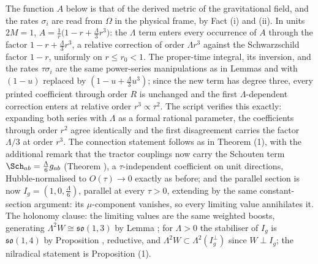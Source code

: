 The function $A$ below is that of the derived metric of the gravitational field, and the rates $\sigma_i$ are read from $\Omega$ in the physical frame, by Fact (i) and (ii). In units $2M = 1$, $A = \tfrac{1}{r}\bigl(1 - r + \tfrac{\Lambda}{3}r^3\bigr)$: the $\Lambda$ term enters every occurrence of $A$ through the factor $1 - r + \tfrac{\Lambda}{3}r^3$, a relative correction of order $\Lambda r^3$ against the Schwarzschild factor $1 - r$, uniformly on $r \le r_0 < 1$. The proper-time integral, its inversion, and the rates $\tau\sigma_i$ are the same power-series manipulations as in Lemmas  and  with $(1-u)$ replaced by $(1 - u + \tfrac{\Lambda}{3}u^3)$; since the new term has degree three, every printed coefficient through order $R$ is unchanged and the first $\Lambda$-dependent correction enters at relative order $r^3 \propto \tau^2$. The script verifies this exactly: expanding both series with $\Lambda$ as a formal rational parameter, the coefficients through order $r^{2}$ agree identically and the first disagreement carries the factor $\Lambda/3$ at order $r^3$. The connection statement follows as in Theorem (1), with the additional remark that the tractor couplings now carry the Schouten term $\Sch_{ab} = \tfrac{\Lambda}{6}g_{ab}$ (Theorem ), a $\tau$-independent coefficient on unit directions, Hubble-normalised to $O(\tau) \to 0$ exactly as before; and the parallel section is now $I_g = (1, 0, \tfrac{\Lambda}{6})$, parallel at every $\tau > 0$, extending by the same constant-section argument: its $\mu$-component vanishes, so every limiting value annihilates it. The holonomy clause: the limiting values are the same weighted boosts, generating $\Lambda^2 W \cong \mathfrak{so}(1,3)$ by Lemma ; for $\Lambda > 0$ the stabiliser of $I_g$ is $\mathfrak{so}(1,4)$ by Proposition , reductive, and $\Lambda^2 W \subset \Lambda^2(I_g^\perp)$ since $W \perp I_g$; the nilradical statement is Proposition (1).
